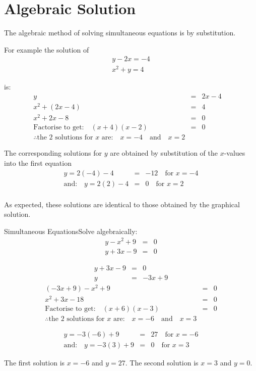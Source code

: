 \section{Algebraic Solution}
The algebraic method of solving simultaneous equations is by substitution.

For example the solution of
\begin{eqnarray*}
y-2x=-4\\
x^2+y=4
\end{eqnarray*}

is:
\begin{eqnarray*}
y&=&2x-4 \quad \\
x^2+(2x-4)&=&4 \\
x^2+2x-8&=&0 \\
\mbox{Factorise to get:}\quad (x+4)(x-2)&=&0\\
\therefore \mbox{the 2 solutions for $x$ are:}\quad x=-4\quad \mbox{and}\quad x=2
\end{eqnarray*}

The corresponding solutions for $y$ are obtained by substitution of the $x$-values into the first equation
\begin{eqnarray*}
y=2(-4)-4&=&-12 \quad \mbox{for $x=-4$}\\
\mbox{and:}\quad y=2(2)-4&=&0 \quad \mbox{for $x=2$}\\
\end{eqnarray*}

As expected, these solutions are identical to those obtained by the graphical solution.

\begin{wex}{Simultaneous Equations}{Solve algebraically:
\begin{eqnarray*}
y-x^2+9&=&0\\
y+3x-9&=&0
\end{eqnarray*}}
{
\begin{eqnarray*}
y+3x-9&=&0\\
y&=&-3x+9
\end{eqnarray*}
\begin{eqnarray*}
(-3x+9)-x^2+9&=&0\\
x^2+3x-18&=&0\\
\mbox{Factorise to get:}\quad (x+6)(x-3)&=&0\\
\therefore \mbox{the 2 solutions for $x$ are:}\quad x=-6\quad \mbox{and}\quad x=3
\end{eqnarray*}

\begin{eqnarray*}
y= -3(-6)+9&=&27 \quad \mbox{for $x=-6$}\\
\mbox{and:}\quad y=-3(3)+9&=&0 \quad \mbox{for $x=3$}
\end{eqnarray*}

The first solution is $x=-6$ and $y=27$. The second solution is $x=3$ and $y=0$.}
\end{wex}

